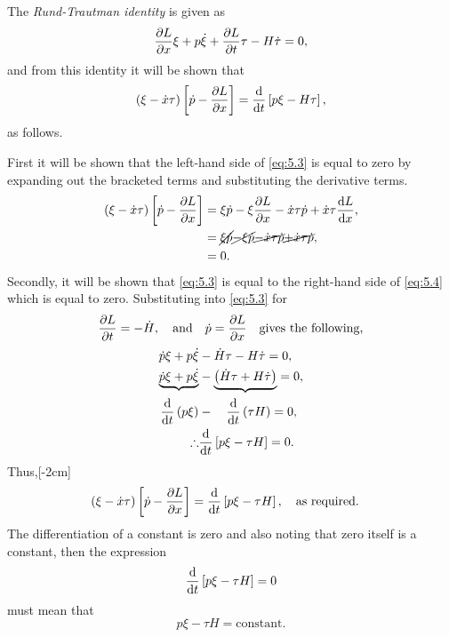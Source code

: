 The \textit{Rund-Trautman identity} is given as
\begin{equation}
	\label{eq:5.3}
	\frac{\partial L}{\partial x}\xi +p\dot{\xi} +\frac{\partial L}{\partial t}\tau - H\dot{\tau}=0,
\end{equation}
and from this identity it will be shown that 
\begin{equation}
	\label{eq:5.4}
	\left(\xi-\dot{x}\tau\right)\left[\dot{p}-\frac{\partial L}{\partial x}\right] = \frac{\mathrm{d}}{\mathrm{d}t}\left[p\xi-H\tau\right],
\end{equation}
as follows.

First it will be shown that the left-hand side of \eqref{eq:5.3} is equal to zero by expanding out the bracketed terms and substituting the derivative terms.
\begin{align*}
	\left(\xi-\dot{x}\tau\right)\left[\dot{p}-\frac{\partial L}{\partial x}\right] &= \xi\dot{p} -\xi\frac{\partial L}{\partial x} - \dot{x}\tau\dot{p} + \dot{x}\tau\frac{\mathrm{d}L}{\mathrm{d}x},\\
	&= \cancel{\xi\dot{p}} \cancel{-\xi\dot{p}} \cancel{- \dot{x}\tau\dot{p}} \cancel{+ \dot{x}\tau\dot{p}},\\
	&=0.
\end{align*}
Secondly, it will be shown that \eqref{eq:5.3} is equal to the right-hand side of \eqref{eq:5.4} which is equal to zero.
Substituting into \eqref{eq:5.3} for\[\frac{\partial L}{\partial t} = -\dot{H},\quad\text{and}\quad \dot{p} = \frac{\partial L}{\partial x}\quad\text{gives the following,}\]
\begin{align*}
	\dot{p}\xi +p\dot{\xi} &-\dot{H}\tau - H\dot{\tau}=0,\\
	\underbrace{\dot{p}\xi +p\dot{\xi}} &-\underbrace{\left(\dot{H}\tau + H\dot{\tau}\right)}=0,\\
	\frac{\mathrm{d}}{\mathrm{d}t}\left(p\xi\right) &-\quad \frac{\mathrm{d}}{\mathrm{d}t}\left(\tau H\right) = 0,\\
	\therefore &\frac{\mathrm{d}}{\mathrm{d}t}\left[p\xi - \tau H\right] = 0.
\end{align*}
Thus,[-2cm]
\[
	\left(\xi-\dot{x}\tau\right)\left[\dot{p}-\frac{\partial L}{\partial x}\right] = \frac{\mathrm{d}}{\mathrm{d}t}\left[p\xi - \tau H\right],\quad\text{as required.}\quad
\]
The differentiation of a constant is zero and also noting that zero itself is a constant, then the expression 
\[
	\frac{\mathrm{d}}{\mathrm{d}t}\left[p\xi - \tau H\right] = 0
\]
must mean that 
\[
	p\xi - \tau H = \text{constant}.
\]
